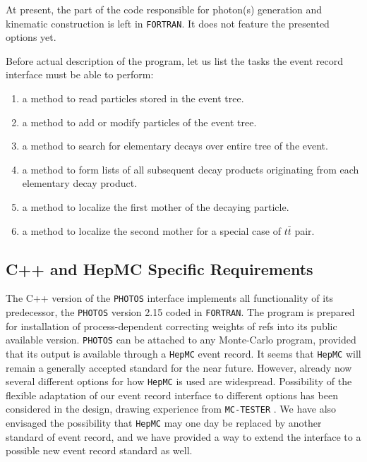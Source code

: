 \documentclass[]{Photos_interface_design}
\begin{document}
At present, the part of the code responsible for photon(s) generation and kinematic 
construction is left in  {\tt FORTRAN}. It does not feature the presented options yet.


Before actual description of the program, let us list the tasks the event record interface must be able to perform:
\begin{enumerate}
\item a method to read  particles stored in the event tree.
\item a method to add or modify particles of the event tree.
\item a method to search for elementary decays over entire tree of the event.
\item a method to form lists of all subsequent decay products originating from each elementary decay product.
\item a method to localize the first mother of the decaying particle. 
\item a method to localize the second mother for a special case of $t \bar t$ pair.
\end{enumerate}


\subsection{C++ and HepMC Specific Requirements}

The C++ version of the {\tt PHOTOS} interface implements all functionality
of its predecessor, the {\tt PHOTOS} version 2.15 \cite{Golonka:2005pn} coded in {\tt FORTRAN}.
The program is prepared for installation of process-dependent correcting weights of refs 
\cite{Golonka:2006tw,Nanava:2009vg} into its public available version. 
{\tt PHOTOS} can be attached to any Monte-Carlo program,
provided that its output is available through a {\tt HepMC} \cite{Dobbs:2001ck} event record.
It seems that {\tt HepMC} will
remain a generally accepted standard for the near future. However,
already now several different options for how {\tt HepMC} is used are
widespread. Possibility of the flexible  adaptation of our event record 
interface to different
options has been considered in the design,  drawing experience
from {\tt MC-TESTER} \cite{Golonka:2002rz,Davidson:2008ma}.
We have also
envisaged the possibility that {\tt HepMC} may one day be replaced by another
standard of event record, and we have provided a way to extend
the interface to a possible new event record standard as well.
\end{document}
